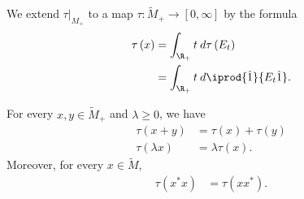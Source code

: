 \documentclass[10pt]{mypackage}
\begin{document}
We extend $\tau|_{M_{+}}$ to a map $\tau\colon \widetilde{M}_{+}\rightarrow [0,\infty]$ by the formula
\begin{align*}
  \tau\left( x \right) &= \int_{\R_{+}}^{} t\:d\tau\left( E_t \right)\\
                       &= \int_{\R_{+}}^{} t\:d \iprod{\hat{1}}{E_t\hat{1}}.
\end{align*}
\begin{lemma}
  For every $x,y\in \widetilde{M}_{+}$ and $\lambda\geq 0$, we have
  \begin{align*}
    \tau\left( x + y \right) &= \tau\left( x \right) + \tau\left( y \right)\\
    \tau\left( \lambda x \right) &= \lambda \tau\left( x \right).
  \end{align*}
  Moreover, for every $x\in \widetilde{M}$,
  \begin{align*}
    \tau\left( x^{\ast}x \right) &= \tau\left( xx^{\ast} \right).
  \end{align*}
\end{lemma}
\end{document}
